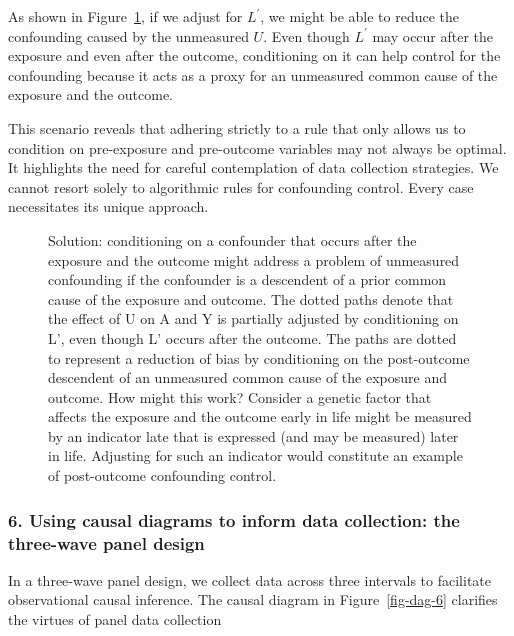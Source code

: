 \documentclass[
  singlecolumn]{article}
\begin{document}
As shown in Figure~\ref{fig-dag-descendent-solution-2}, if we adjust for
\(L^\prime\), we might be able to reduce the confounding caused by the
unmeasured \(U\). Even though \(L^\prime\) may occur after the exposure
and even after the outcome, conditioning on it can help control for the
confounding because it acts as a proxy for an unmeasured common cause of
the exposure and the outcome.

This scenario reveals that adhering strictly to a rule that only allows
us to condition on pre-exposure and pre-outcome variables may not always
be optimal. It highlights the need for careful contemplation of data
collection strategies. We cannot resort solely to algorithmic rules for
confounding control. Every case necessitates its unique approach.

\begin{figure}


\caption{\label{fig-dag-descendent-solution-2}Solution: conditioning on
a confounder that occurs after the exposure and the outcome might
address a problem of unmeasured confounding if the confounder is a
descendent of a prior common cause of the exposure and outcome. The
dotted paths denote that the effect of U on A and Y is partially
adjusted by conditioning on L', even though L' occurs after the outcome.
The paths are dotted to represent a reduction of bias by conditioning on
the post-outcome descendent of an unmeasured common cause of the
exposure and outcome. How might this work? Consider a genetic factor
that affects the exposure and the outcome early in life might be
measured by an indicator late that is expressed (and may be measured)
later in life. Adjusting for such an indicator would constitute an
example of post-outcome confounding control.}

\end{figure}%

\subsubsection{6. Using causal diagrams to inform data collection: the
three-wave panel
design}\label{using-causal-diagrams-to-inform-data-collection-the-three-wave-panel-design}

In a three-wave panel design, we collect data across three intervals to
facilitate observational causal inference. The causal diagram in
Figure~\ref{fig-dag-6} clarifies the virtues of panel data collection
\end{document}
